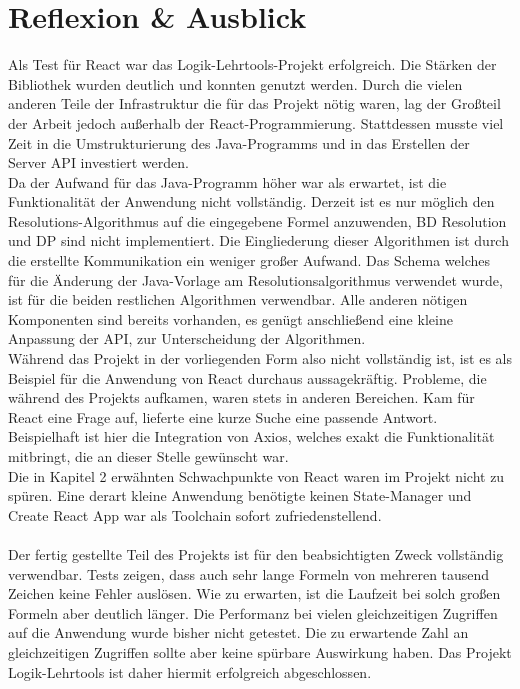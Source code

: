 \section{Reflexion \& Ausblick}
Als Test für React war das Logik-Lehrtools-Projekt erfolgreich. Die Stärken der Bibliothek wurden deutlich und konnten genutzt werden. Durch die vielen anderen Teile der Infrastruktur die für das Projekt nötig waren, lag der Großteil der Arbeit jedoch außerhalb der React-Programmierung. Stattdessen musste viel Zeit in die Umstrukturierung des Java-Programms und in das Erstellen der Server API investiert werden.\\ 
Da der Aufwand für das Java-Programm höher war als erwartet, ist die Funktionalität der Anwendung nicht vollständig. Derzeit ist es nur möglich den Resolutions-Algorithmus auf die eingegebene Formel anzuwenden, BD Resolution und DP sind nicht implementiert. Die Eingliederung dieser Algorithmen ist durch die erstellte Kommunikation ein weniger großer Aufwand. Das Schema welches für die Änderung der Java-Vorlage am Resolutionsalgorithmus verwendet wurde, ist für die beiden restlichen Algorithmen verwendbar. Alle anderen nötigen Komponenten sind bereits vorhanden, es genügt anschließend eine kleine Anpassung der API, zur Unterscheidung der Algorithmen. \\
Während das Projekt in der vorliegenden Form also nicht vollständig ist, ist es als Beispiel für die Anwendung von React durchaus aussagekräftig. Probleme, die während des Projekts aufkamen, waren stets in anderen Bereichen. Kam für React eine Frage auf, lieferte eine kurze Suche eine passende Antwort. Beispielhaft ist hier die Integration von Axios, welches exakt die Funktionalität mitbringt, die an dieser Stelle gewünscht war.\\
Die in Kapitel 2 erwähnten Schwachpunkte von React waren im Projekt nicht zu spüren. Eine derart kleine Anwendung benötigte keinen State-Manager und Create React App war als Toolchain sofort zufriedenstellend.\\\\
Der fertig gestellte Teil des Projekts ist für den beabsichtigten Zweck vollständig verwendbar. Tests zeigen, dass auch sehr lange Formeln von mehreren tausend Zeichen keine Fehler auslösen. Wie zu erwarten, ist die Laufzeit bei solch großen Formeln aber deutlich länger. Die Performanz bei vielen gleichzeitigen Zugriffen auf die Anwendung wurde bisher nicht getestet. Die zu erwartende Zahl an gleichzeitigen Zugriffen sollte aber keine spürbare Auswirkung haben. Das Projekt Logik-Lehrtools ist daher hiermit erfolgreich abgeschlossen.\\
